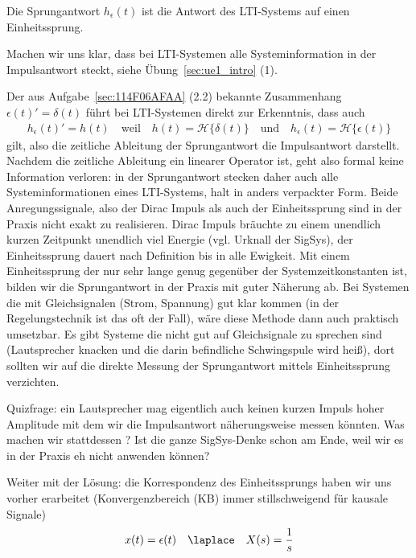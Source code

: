 \begin{Loesung}
\begin{itemize}
Die Sprungantwort $h_\epsilon(t)$ ist die Antwort des LTI-Systems auf einen Einheitssprung.

Machen wir uns klar, dass bei LTI-Systemen alle Systeminformation in der Impulsantwort
steckt, siehe Übung~\ref{sec:ue1_intro} (1).

Der aus Aufgabe~\ref{sec:114F06AFAA} (2.2) bekannte Zusammenhang $\epsilon(t)' = \delta(t)$ führt bei LTI-Systemen
direkt zur Erkenntnis, dass auch
\begin{eqnarray}
h_\epsilon(t)' = h(t)\quad\text{weil}\quad
h(t)=\mathcal{H}\{\delta(t)\}
\quad\text{und}\quad
h_\epsilon(t)=\mathcal{H}\{\epsilon(t)\}
\end{eqnarray}
gilt, also die zeitliche Ableitung der Sprungantwort die Impulsantwort darstellt.
%
Nachdem die zeitliche Ableitung ein linearer Operator ist, geht also formal keine
Information verloren: in der Sprungantwort stecken daher auch alle Systeminformationen
eines LTI-Systems, halt in anders verpackter Form.
%
Beide Anregungssignale, also der Dirac Impuls als auch der Einheitssprung sind in
der Praxis nicht exakt zu realisieren. Dirac Impuls bräuchte zu einem unendlich kurzen
Zeitpunkt unendlich viel Energie (vgl. Urknall der SigSys), der Einheitssprung
dauert nach Definition bis in alle Ewigkeit.
%
Mit einem Einheitssprung der nur sehr lange genug gegenüber der Systemzeitkonstanten
ist, bilden wir die Sprungantwort in der Praxis mit guter Näherung ab.
%
Bei Systemen die mit Gleichsignalen
(Strom, Spannung) gut klar kommen
(in der Regelungstechnik ist das oft der Fall), wäre diese Methode dann auch
praktisch umsetzbar.
%
Es gibt Systeme die nicht gut auf Gleichsignale zu sprechen sind (Lautsprecher
knacken und die darin befindliche Schwingspule wird heiß),
dort sollten wir auf die direkte Messung der Sprungantwort mittels
Einheitssprung verzichten.
%

Quizfrage: ein Lautsprecher mag eigentlich auch keinen kurzen Impuls hoher Amplitude
mit dem wir die Impulsantwort näherungsweise messen könnten. Was machen wir stattdessen
? Ist die ganze SigSys-Denke schon am Ende, weil wir es in der Praxis eh nicht
anwenden können?


Weiter mit der Lösung: die Korrespondenz des Einheitssprungs
haben wir uns vorher erarbeitet (Konvergenzbereich (KB) immer stillschweigend für kausale Signale)
\begin{equation}
x(t)=\epsilon(t) \quad \laplace \quad X(s)=\frac{1}{s}
\end{equation}


\end{itemize}
\end{Loesung}
